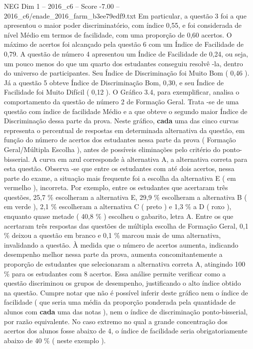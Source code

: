\begin{textsample}{NEG Dim 1 – 2016\_c6 – Score -7.00 – 2016\_c6/enade\_2016\_farm\_b3ee79edf9.txt}
Em particular, a questão 3 foi a que apresentou o maior poder discriminatório, com índice 0,55, e foi considerada de nível Médio em termos de facilidade, com uma proporção de 0,60 acertos.
O máximo de acertos foi alcançado pela questão 6 com um Índice de Facilidade de 0,79.
A questão de número 4 apresentou um Índice de Facilidade de 0,24, ou seja, um pouco menos do que um quarto dos estudantes conseguiu resolvê -la, dentro do universo de participantes.
Seu Índice de Discriminação foi Muito Bom ( 0,46 ).
Já a questão 5 obteve Índice de Discriminação Bom, 0,30, e seu Índice de Facilidade foi Muito Difícil ( 0,12 ).
O Gráfico 3.4, para exemplificar, analisa o comportamento da questão de número 2 de Formação Geral.
Trata -se de uma questão com índice de facilidade Médio e a que obteve o segundo maior Índice de Discriminação dessa parte da prova.
Neste gráfico, \textbf{cada} uma das cinco curvas representa o percentual de respostas em determinada alternativa da questão, em função do número de acertos dos estudantes nessa parte da prova ( Formação Geral/Múltipla Escolha ), antes de possíveis eliminações pelo critério do ponto-bisserial.
A curva em azul corresponde à alternativa A, a alternativa correta para esta questão.
Observa -se que entre os estudantes com até dois acertos, nessa parte do exame, a situação mais frequente foi a escolha da alternativa E ( em vermelho ), incorreta.
Por exemplo, entre os estudantes que acertaram três questões, 25,7 \% escolheram a alternativa E, 29,9 \% escolheram a alternativa B ( em verde ), 2,1 \% escolheram a alternativa C ( preto ) e 1,3 \% a D ( roxo ), enquanto quase metade ( 40,8 \% ) escolheu o gabarito, letra A.
Entre os que acertaram três respostas das questões de múltipla escolha de Formação Geral, 0,1 \% deixou a questão em branco e 0,1 \% marcou mais de uma alternativa, invalidando a questão.
À medida que o número de acertos aumenta, indicando desempenho melhor nessa parte da prova, aumenta concomitantemente a proporção de estudantes que selecionaram a alternativa correta A, atingindo 100 \% para os estudantes com 8 acertos.
Essa análise permite verificar como a questão discriminou os grupos de desempenho, justificando o alto índice obtido na questão.
Cumpre notar que não é possível inferir deste gráfico nem o índice de facilidade ( que seria uma média da proporção ponderada pela quantidade de alunos com \textbf{cada} uma das notas ), nem o índice de discriminação ponto-bisserial, por razão equivalente.
No caso extremo no qual a grande concentração dos acertos dos alunos fosse abaixo de 4, o índice de facilidade seria obrigatoriamente abaixo de 40 \% ( neste exemplo ).

\end{textsample}
